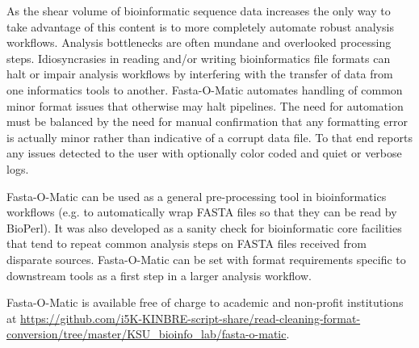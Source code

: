 As the shear volume of bioinformatic sequence data increases the only way to take advantage of this content is to more completely automate robust analysis workflows. Analysis bottlenecks are often mundane and overlooked processing steps. Idiosyncrasies in reading and/or writing bioinformatics file formats can halt or impair analysis workflows by interfering with the transfer of data from one informatics tools to another.  Fasta-O-Matic automates handling of common minor format issues that otherwise may halt pipelines. The need for automation must be balanced by the need for manual confirmation that any formatting error is actually minor rather than indicative of a corrupt data file. To that end reports any issues detected to the user with optionally color coded and quiet or verbose logs.

Fasta-O-Matic can be used as a general pre-processing tool in bioinformatics workflows (e.g. to automatically wrap FASTA files so that they can be read by BioPerl). It was also developed as a sanity check for bioinformatic core facilities that tend to repeat common analysis steps on FASTA files received from disparate sources. Fasta-O-Matic can be set with format requirements specific to downstream tools as a first step in a larger analysis workflow.

Fasta-O-Matic is available free of charge to academic and non-profit institutions at \url{https://github.com/i5K-KINBRE-script-share/read-cleaning-format-conversion/tree/master/KSU\_bioinfo\_lab/fasta-o-matic}.
  
  
  
  
  
  
